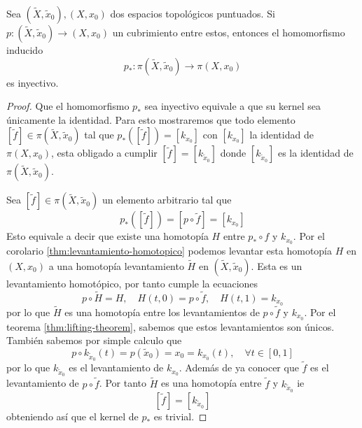 \begin{teorema}
  \label{thm:inyec-covering}
  Sea \(\left( \tilde X, \tilde x_0 \right), \left( X, x_0 \right)\)
  dos espacios topológicos puntuados. Si \(p : \left( \tilde X, \tilde x_0
  \right) \to \left( X, x_0 \right)\) un cubrimiento entre estos,
  entonces el homomorfismo inducido
  \[ p_* : \pi \left( \tilde X, \tilde x_0 \right) \longrightarrow \pi
    \left( X, x_0 \right)\]
  es inyectivo.
\end{teorema}
\begin{proof}
  Que el homomorfismo \(p_*\) sea inyectivo equivale a que su
  kernel sea únicamente la identidad. Para esto
mostraremos que todo elemento \([\tilde f] \in \pi
(\tilde X , \tilde x_0)\) tal que \(p_* ([\tilde f]) = [k_{x _0}]\) con \([k_{ x _0}]\)
la identidad de \(\pi (X, x_0)\), esta obligado a cumplir \([\tilde f] =
[k_{\tilde x _0}]\) donde \([k_{\tilde x _0}]\) es la identidad de \(\pi (\tilde X ,
\tilde x _0)\).

Sea \([\tilde f] \in \pi (\tilde X, \tilde x _0)\) un elemento
arbitrario tal que
\[p_* ([\tilde f]) = [p \circ \tilde f] = [k_{ x _0}]\]
Esto equivale a decir que existe una homotopía \(H\) entre \(p_* \circ
f\) y \(k_{x _0}\). Por el corolario \ref{thm:levantamiento-homotopico} podemos
levantar esta homotopía \(H\) en \((X, x_0)\) a una homotopía
levantamiento \(\tilde H\) en \((\tilde X , \tilde x _0)\). Esta es un
levantamiento homotópico, por tanto cumple la ecuaciones
\[ p \circ \tilde H = H, \quad H (t, 0) = p \circ \tilde f, \quad H (t,
  1) = k_{x _0} \]
por lo que \(\tilde H\) es una homotopía entre los levantamientos de \(p
\circ \tilde f\) y \(k_{x _0}\). Por el teorema \ref{thm:lifting-theorem},
sabemos que estos levantamientos son únicos. También sabemos por simple
calculo que
\[ p \circ k_{\tilde x _0} (t) = p \left( \tilde x_0 \right) = x_0 =
  k_{x_0} (t) ,\quad \forall t \in [0,1] \]
por lo que \(k_{\tilde x _0}\) es el levantamiento de \(k_{x_0}\).
Además de ya conocer que \(\tilde f\) es el levantamiento de \(p \circ
\tilde f\). Por tanto \(\tilde H\) es una homotopía entre \(\tilde f\) y
\(k_{\tilde x _0}\) ie
\[[\tilde f] = [k_{\tilde x_0}]\]
obteniendo así que el kernel de \(p_*\) es trivial.
\end{proof}

